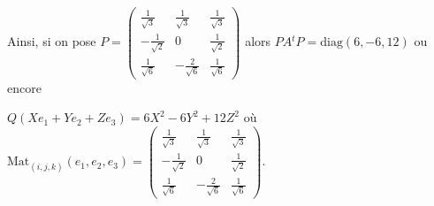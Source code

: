 {\begin{enumerate}
{Ainsi, si on pose $P=\left(
\begin{array}{ccc}
\frac{1}{\sqrt{3}}&\frac{1}{\sqrt{3}}&\frac{1}{\sqrt{3}}\\
-\frac{1}{\sqrt{2}}&0&\frac{1}{\sqrt{2}}\\
\frac{1}{\sqrt{6}}&-\frac{2}{\sqrt{6}}&\frac{1}{\sqrt{6}}
\end{array}\right)$ alors $PA{^t}P=\text{diag}(6,-6,12)$ ou encore

\begin{center}
$Q(Xe_1+Ye_2+Ze_3) =6X^2-6Y^2+12Z^2$ où $\text{Mat}_{(i,j,k)}(e_1,e_2,e_3)=\left(
\begin{array}{ccc}
\frac{1}{\sqrt{3}}&\frac{1}{\sqrt{3}}&\frac{1}{\sqrt{3}}\\
-\frac{1}{\sqrt{2}}&0&\frac{1}{\sqrt{2}}\\
\frac{1}{\sqrt{6}}&-\frac{2}{\sqrt{6}}&\frac{1}{\sqrt{6}}
\end{array}\right)$.
\end{center}}
\end{enumerate}
}